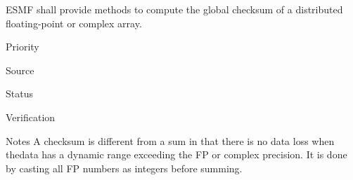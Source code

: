 
ESMF shall provide methods to compute the global checksum of a
distributed floating-point or complex array. 

\begin{reqlist}
\item[Priority]
\item[Source]
\item[Status]
\item[Verification]
\item[Notes] A checksum is different from a sum in that there is no
  data loss when thedata has a dynamic range exceeding the FP or
  complex precision. It is done by casting all FP numbers as integers before
  summing.
\end{reqlist}

%
%










